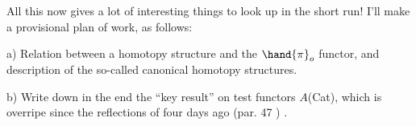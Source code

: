 All this now gives a lot of interesting things to look up in the
short run!  I'll make a provisional plan of work, as follows:

a)  Relation between a homotopy structure and the $\hand{\ensuremath{\pi}}_{o}$ functor,  and
description of the so-called canonical homotopy structures.

b)  Write down in the end the ``key result'' on test functors $A$\hand{$\rightarrow$}(Cat),
which  is overripe since the reflections  of four days ago (par. 47 ) .

